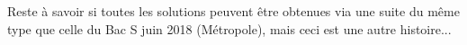 Reste à savoir si toutes les solutions peuvent être obtenues via une suite du même type que celle du Bac S juin 2018 (Métropole), mais ceci est une autre histoire...
